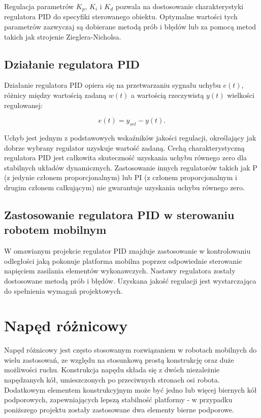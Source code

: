 Regulacja parametrów $K_p$, $K_i$ i $K_d$ pozwala na dostosowanie charakterystyki regulatora PID do specyfiki sterowanego obiektu. Optymalne wartości tych parametrów zazwyczaj są dobierane metodą prób i błędów lub za pomocą metod takich jak strojenie Zieglera-Nicholsa.

\subsection{Działanie regulatora PID}

Działanie regulatora PID opiera się na przetwarzaniu sygnału uchybu $e(t)$, różnicy między wartością zadaną $w(t)$ a wartością rzeczywistą $y(t)$ wielkości regulowanej:

\begin{equation}
e(t) = y_{set} - y(t) .
\end{equation}

Uchyb jest jednym z podstawowych wskaźników jakości regulacji, określający jak dobrze wybrany regulator uzyskuje wartość zadaną. Cechą charakterystyczną regulatora PID jest całkowita skuteczność uzyskania uchybu równego zero dla stabilnych układów dynamicznych. Zastosowanie innych regulatorów takich jak P (z jedynie członem proporcjonalnym) lub PI (z członem proporcjonalnym i drugim 
członem całkującym) nie gwarantuje uzyskania uchybu równego zero. 


\subsection{Zastosowanie regulatora PID w sterowaniu robotem mobilnym}

W omawianym projekcie regulator PID znajduje zastosowanie w kontrolowaniu odległości jaką pokonuje platforma mobilna poprzez odpowiednie sterowanie napięciem zasilania elementów wykonawczych. Nastawy regulatora zostały dostosowane metodą prób i błędów. Uzyskana jakość regulacji jest wystarczająca do spełnienia wymagań projektowych. 

\section{Napęd różnicowy}

Napęd różnicowy jest często stosowanym rozwiązaniem w robotach mobilnych do wielu zastosowań, ze względu na stosunkową prostą konstrukcję oraz duże możliwości ruchu.  Konstrukcja napędu składa się z dwóch niezależnie napędzanych kół, umieszczonych po przeciwnych stronach osi robota. Dodatkowym elementem konstrukcyjnym może być jedno lub więcej biernych kół podporowych, zapewniających lepszą stabilność platformy - w przypadku poniższego projektu zostały zastosowane dwa elementy bierne podporowe. 

